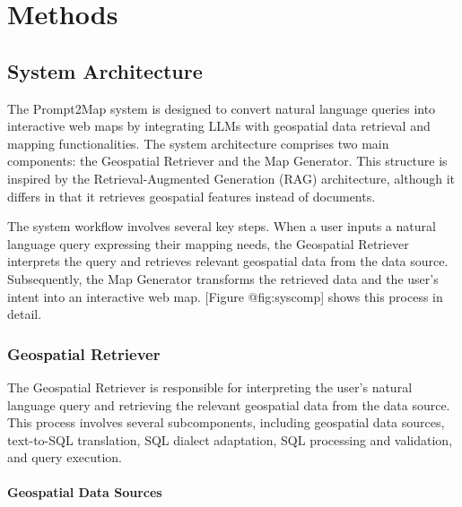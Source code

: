 
%

\chapter{Methods}
\label{cha:methods}

\section{System Architecture}

The Prompt2Map system is designed to convert natural language queries into interactive web maps by integrating LLMs with geospatial data retrieval and mapping functionalities. The system architecture comprises two main components: the Geospatial Retriever and the Map Generator. This structure is inspired by the Retrieval-Augmented Generation (RAG) architecture, although it differs in that it retrieves geospatial features instead of documents.

The system workflow involves several key steps. When a user inputs a natural language query expressing their mapping needs, the Geospatial Retriever interprets the query and retrieves relevant geospatial data from the data source. Subsequently, the Map Generator transforms the retrieved data and the user's intent into an interactive web map. [Figure @fig:syscomp] shows this process in detail.


\subsection{Geospatial Retriever}

The Geospatial Retriever is responsible for interpreting the user's natural language query and retrieving the relevant geospatial data from the data source. This process involves several subcomponents, including geospatial data sources, text-to-SQL translation, SQL dialect adaptation, SQL processing and validation, and query execution.

\subsubsection{Geospatial Data Sources}

